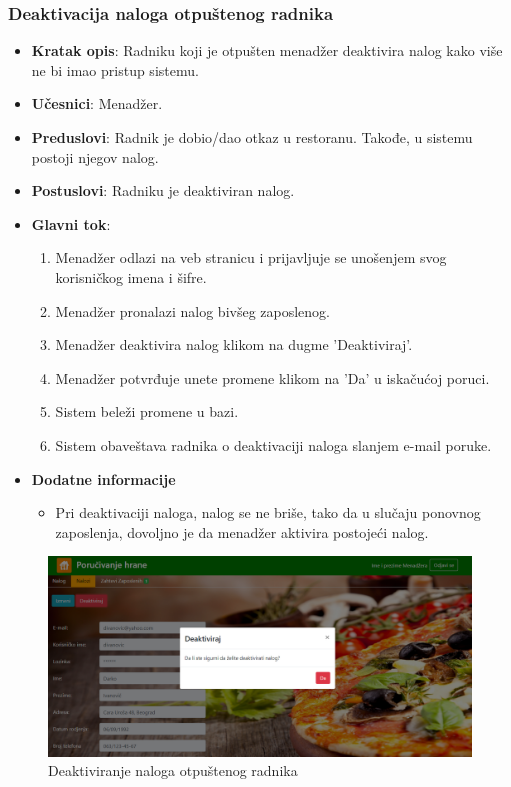 \newpage
 \subsubsection{Deaktivacija naloga otpuštenog radnika}
 
 \begin{itemize}
    \item \textbf{Kratak opis}:
   Radniku koji je otpušten menadžer deaktivira nalog kako više ne bi imao pristup sistemu.
    \item \textbf{Učesnici}:
    Menadžer.
    \item \textbf{Preduslovi}:
    Radnik je dobio/dao otkaz u restoranu. Takođe, u sistemu postoji njegov nalog.
    \item \textbf{Postuslovi}:
    Radniku je deaktiviran nalog. 
    \item \textbf{Glavni tok}:
    \begin{enumerate}
        \item Menadžer odlazi na veb stranicu i prijavljuje se unošenjem svog korisničkog imena i šifre.
        \item Menadžer pronalazi nalog bivšeg zaposlenog.
        \item Menadžer deaktivira nalog klikom na dugme 'Deaktiviraj'.
        \item Menadžer potvrđuje unete promene klikom na  'Da' u iskačućoj poruci.
        \item Sistem beleži promene u bazi.
        \item Sistem obaveštava radnika o deaktivaciji naloga slanjem e-mail poruke.
    \end{enumerate}
\item \textbf{Dodatne informacije}
 \begin{itemize}
     \item Pri deaktivaciji naloga, nalog se ne briše, tako da u slučaju ponovnog zaposlenja, dovoljno je da menadžer aktivira postojeći nalog.
 \end{itemize}
 \end{itemize}
 
 
 \begin{figure}[!h]
    \includegraphics[width=1\textwidth]{slike/menadzer_deaktiviranje.PNG}
    \caption{Deaktiviranje naloga otpuštenog radnika} %
    \label{fig:slika_deaktiviranje}
\end{figure}


